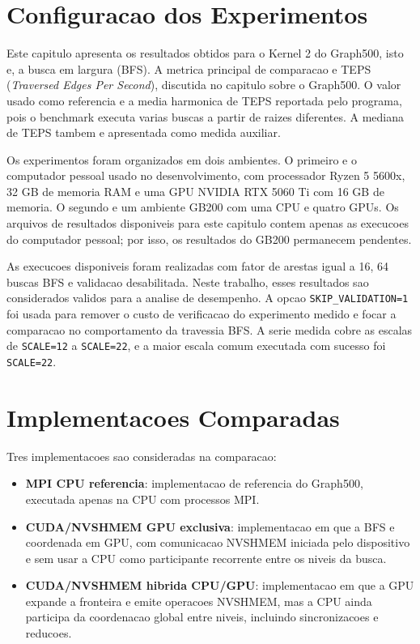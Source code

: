 \section{Configuracao dos Experimentos}

Este capitulo apresenta os resultados obtidos para o Kernel 2 do Graph500, isto
e, a busca em largura (BFS). A metrica principal de comparacao e TEPS
(\textit{Traversed Edges Per Second}), discutida no capitulo sobre o Graph500. O
valor usado como referencia e a media harmonica de TEPS reportada pelo programa,
pois o benchmark executa varias buscas a partir de raizes diferentes. A mediana de
TEPS tambem e apresentada como medida auxiliar.

Os experimentos foram organizados em dois ambientes. O primeiro e o computador
pessoal usado no desenvolvimento, com processador Ryzen 5 5600x, 32 GB de memoria
RAM e uma GPU NVIDIA RTX 5060 Ti com 16 GB de memoria. O segundo e um ambiente
GB200 com uma CPU e quatro GPUs. Os arquivos de resultados disponiveis para este
capitulo contem apenas as execucoes do computador pessoal; por isso, os resultados
do GB200 permanecem pendentes.

As execucoes disponiveis foram realizadas com fator de arestas igual a 16, 64
buscas BFS e validacao desabilitada. Neste trabalho, esses resultados sao
considerados validos para a analise de desempenho. A opcao
\texttt{SKIP\_VALIDATION=1} foi usada para remover o custo de verificacao do
experimento medido e focar a comparacao no comportamento da travessia BFS. A
serie medida cobre as escalas de \texttt{SCALE=12} a \texttt{SCALE=22}, e a maior
escala comum executada com sucesso foi \texttt{SCALE=22}.

\section{Implementacoes Comparadas}

Tres implementacoes sao consideradas na comparacao:

\begin{itemize}
\item \textbf{MPI CPU referencia}: implementacao de referencia do Graph500,
executada apenas na CPU com processos MPI.
\item \textbf{CUDA/NVSHMEM GPU exclusiva}: implementacao em que a BFS e coordenada
em GPU, com comunicacao NVSHMEM iniciada pelo dispositivo e sem usar a CPU como
participante recorrente entre os niveis da busca.
\item \textbf{CUDA/NVSHMEM hibrida CPU/GPU}: implementacao em que a GPU expande a
fronteira e emite operacoes NVSHMEM, mas a CPU ainda participa da coordenacao
global entre niveis, incluindo sincronizacoes e reducoes.
\end{itemize}

